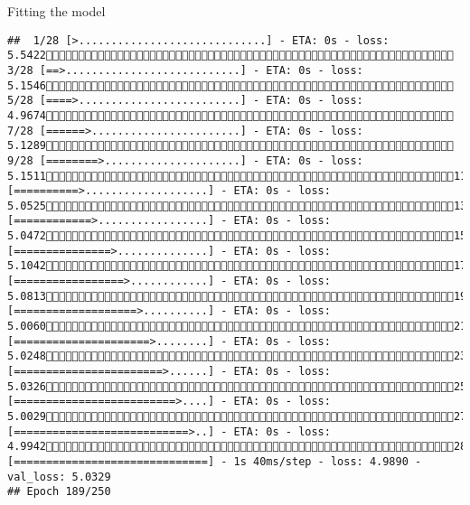\documentclass[
  ignorenonframetext,
]{beamer}
\begin{document}
\begin{frame}[fragile]{Fitting the model}
\begin{verbatim}
##  1/28 [>.............................] - ETA: 0s - loss: 5.5422 3/28 [==>...........................] - ETA: 0s - loss: 5.1546 5/28 [====>.........................] - ETA: 0s - loss: 4.9674 7/28 [======>.......................] - ETA: 0s - loss: 5.1289 9/28 [========>.....................] - ETA: 0s - loss: 5.151111/28 [==========>...................] - ETA: 0s - loss: 5.052513/28 [============>.................] - ETA: 0s - loss: 5.047215/28 [===============>..............] - ETA: 0s - loss: 5.104217/28 [=================>............] - ETA: 0s - loss: 5.081319/28 [===================>..........] - ETA: 0s - loss: 5.006021/28 [=====================>........] - ETA: 0s - loss: 5.024823/28 [=======================>......] - ETA: 0s - loss: 5.032625/28 [=========================>....] - ETA: 0s - loss: 5.002927/28 [===========================>..] - ETA: 0s - loss: 4.994228/28 [==============================] - 1s 40ms/step - loss: 4.9890 - val_loss: 5.0329
## Epoch 189/250

\end{verbatim}
\end{frame}
\end{document}
